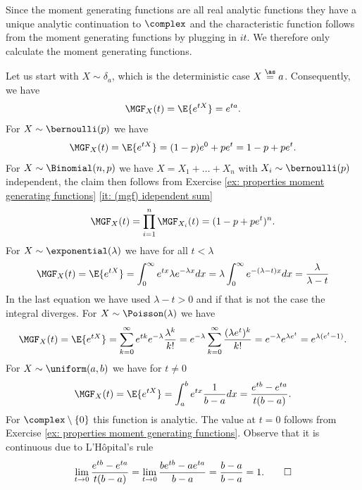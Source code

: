 \begin{solution}
    Since the moment generating functions are all real analytic functions
    they have a unique analytic continuation to \(\complex\)
    and the characteristic function follows from the moment generating functions
    by plugging in \(i t\). We therefore only
    calculate the moment generating functions.

    Let us start with \(X\sim \delta_a\), which is the deterministic case \(X\overset\as=a\).
    Consequently, we have
    \[
        \MGF_X(t) = \E{e^{t X}} = e^{t a}.
    \]
    For \(X\sim \bernoulli(p)\) we have
    \[
        \MGF_X(t) = \E{e^{t X}} = (1-p) e^0 + p e^t = 1 - p + p e^t.
    \]
    For \(X\sim \Binomial(n, p)\) we have \(X = X_1 + \dots + X_n\) with
    \(X_i \sim \bernoulli(p)\) independent, the claim then follows from Exercise
    \ref{ex: properties moment generating functions} \ref{it: (mgf) idependent
    sum}
    \[
        \MGF_X(t) = \prod_{i=1}^n \MGF_{X_i}(t) = (1 - p + p e^t)^n.
    \]
    For \(X \sim \exponential(\lambda)\) we have
    for all \(t < \lambda\)
    \[
        \MGF_X(t) = \E{e^{t X}} = \int_0^\infty e^{t x} \lambda e^{-\lambda x} dx
        = \lambda \int_0^\infty e^{-(\lambda - t) x} dx
        = \frac{\lambda}{\lambda - t}
    \]
    In the last equation we have used \(\lambda -t > 0\) and if that is not the
    case the integral diverges.
    For \(X \sim \Poisson(\lambda)\) we have
    \[
        \MGF_X(t) = \E{e^{t X}} = \sum_{k=0}^\infty e^{t k} e^{-\lambda} \frac{\lambda^k}{k!}
        = e^{-\lambda} \sum_{k=0}^\infty \frac{(\lambda e^t)^k}{k!}
        = e^{-\lambda} e^{\lambda e^t}
        = e^{\lambda (e^t - 1)}.
    \]
    For \(X \sim \uniform(a, b)\) we have for \(t\neq 0\)
    \[
        \MGF_X(t) = \E{e^{t X}} = \int_a^b e^{t x} \frac{1}{b - a} dx
        = \frac{e^{t b} - e^{t a}}{t (b - a)}.
    \]
    For \(\complex\setminus\{0\}\) this function is analytic.
    The value at \(t=0\) follows from Exercise \ref{ex: properties moment generating functions}.
    Observe that it is continuous due to L'Hôpital's rule
    \[
        \lim_{t\to 0} \frac{e^{t b} - e^{t a}}{t (b - a)}
        = \lim_{t\to 0} \frac{b e^{t b} - a e^{t a}}{b - a}
        = \frac{b - a}{b - a} = 1.
        \qedhere
    \]
\end{solution}

